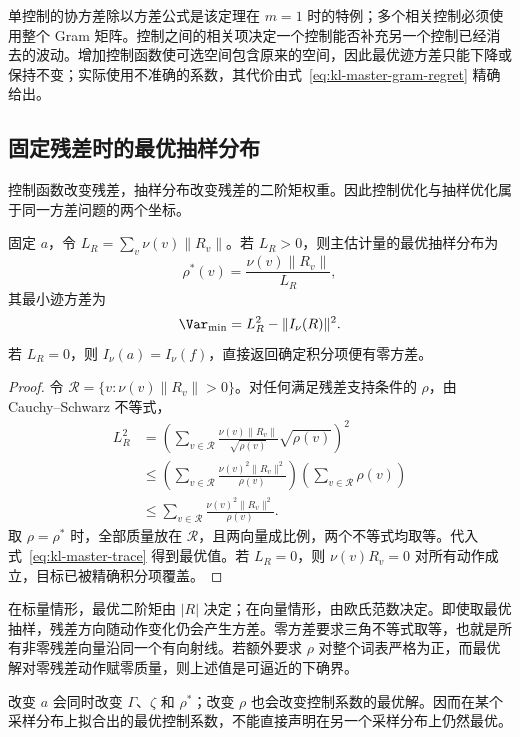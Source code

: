 单控制的协方差除以方差公式是该定理在 $m=1$ 时的特例；多个相关控制必须使用整个 Gram 矩阵。控制之间的相关项决定一个控制能否补充另一个控制已经消去的波动。增加控制函数使可选空间包含原来的空间，因此最优迹方差只能下降或保持不变；实际使用不准确的系数，其代价由式~\eqref{eq:kl-master-gram-regret} 精确给出。

\subsection{固定残差时的最优抽样分布}

控制函数改变残差，抽样分布改变残差的二阶矩权重。因此控制优化与抽样优化属于同一方差问题的两个坐标。

\begin{theorem}[残差范数决定迹方差最优抽样]
\label{thm:kl-master-proposal}
固定 $a$，令 $L_R=\sum_v\nu(v)\lVert R_v\rVert$。若 $L_R>0$，则主估计量的最优抽样分布为
\[
 \rho^*(v)=\frac{\nu(v)\lVert R_v\rVert}{L_R},
\]
其最小迹方差为
\[
 \Var_{\min}=L_R^2-\lVert I_\nu(R)\rVert^2.
\]
若 $L_R=0$，则 $I_\nu(a)=I_\nu(f)$，直接返回确定积分项便有零方差。
\end{theorem}

\begin{proof}
令 $\mathcal R=\{v:\nu(v)\lVert R_v\rVert>0\}$。对任何满足残差支持条件的 $\rho$，由 Cauchy--Schwarz 不等式，
\begin{align*}
 L_R^2
 &=\left(\sum_{v\in\mathcal R}\frac{\nu(v)\lVert R_v\rVert}{\sqrt{\rho(v)}}\sqrt{\rho(v)}\right)^2\\
 &\le\left(\sum_{v\in\mathcal R}\frac{\nu(v)^2\lVert R_v\rVert^2}{\rho(v)}\right)
       \left(\sum_{v\in\mathcal R}\rho(v)\right)\\
 &\le\sum_{v\in\mathcal R}\frac{\nu(v)^2\lVert R_v\rVert^2}{\rho(v)}.
\end{align*}
取 $\rho=\rho^*$ 时，全部质量放在 $\mathcal R$，且两向量成比例，两个不等式均取等。代入式~\eqref{eq:kl-master-trace} 得到最优值。若 $L_R=0$，则 $\nu(v)R_v=0$ 对所有动作成立，目标已被精确积分项覆盖。
\end{proof}

在标量情形，最优二阶矩由 $\lvert R\rvert$ 决定；在向量情形，由欧氏范数决定。即使取最优抽样，残差方向随动作变化仍会产生方差。零方差要求三角不等式取等，也就是所有非零残差向量沿同一个有向射线。若额外要求 $\rho$ 对整个词表严格为正，而最优解对零残差动作赋零质量，则上述值是可逼近的下确界。

改变 $a$ 会同时改变 $\Gamma$、$\zeta$ 和 $\rho^*$；改变 $\rho$ 也会改变控制系数的最优解。因而在某个采样分布上拟合出的最优控制系数，不能直接声明在另一个采样分布上仍然最优。

